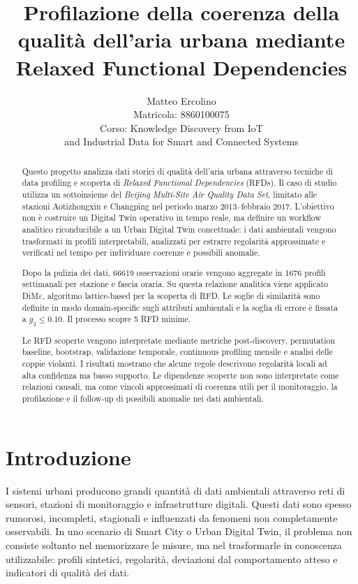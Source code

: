 \documentclass[a4paper,12pt]{article}
\title{\textbf{Profilazione della coerenza della qualità dell'aria urbana mediante Relaxed Functional Dependencies}}
\author{Matteo Ercolino \\ Matricola: 8860100075 \\ Corso: Knowledge Discovery from IoT \\and Industrial Data for Smart and Connected Systems}
\newcommand{\Dime}{DiM\ensuremath{\varepsilon}}
\begin{document}
\maketitle

\begin{abstract}
Questo progetto analizza dati storici di qualità dell'aria urbana attraverso tecniche di data profiling e scoperta di \textit{Relaxed Functional Dependencies} (RFDs). Il caso di studio utilizza un sottoinsieme del \textit{Beijing Multi-Site Air Quality Data Set}, limitato alle stazioni Aotizhongxin e Changping nel periodo marzo 2013--febbraio 2017. L'obiettivo non è costruire un Digital Twin operativo in tempo reale, ma definire un workflow analitico riconducibile a un Urban Digital Twin concettuale: i dati ambientali vengono trasformati in profili interpretabili, analizzati per estrarre regolarità approssimate e verificati nel tempo per individuare coerenze e possibili anomalie.

Dopo la pulizia dei dati, 66619 osservazioni orarie vengono aggregate in 1676 profili settimanali per stazione e fascia oraria. Su questa relazione analitica viene applicato \Dime, algoritmo lattice-based per la scoperta di RFD. Le soglie di similarità sono definite in modo domain-specific sugli attributi ambientali e la soglia di errore è fissata a $g_3 \leq 0.10$. Il processo scopre 5 RFD minime.

Le RFD scoperte vengono interpretate mediante metriche post-discovery, permutation baseline, bootstrap, validazione temporale, continuous profiling mensile e analisi delle coppie violanti. I risultati mostrano che alcune regole descrivono regolarità locali ad alta confidenza ma basso supporto. Le dipendenze scoperte non sono interpretate come relazioni causali, ma come vincoli approssimati di coerenza utili per il monitoraggio, la profilazione e il follow-up di possibili anomalie nei dati ambientali.
\end{abstract}

\section{Introduzione}

I sistemi urbani producono grandi quantità di dati ambientali attraverso reti di sensori, stazioni di monitoraggio e infrastrutture digitali. Questi dati sono spesso rumorosi, incompleti, stagionali e influenzati da fenomeni non completamente osservabili. In uno scenario di Smart City o Urban Digital Twin, il problema non consiste soltanto nel memorizzare le misure, ma nel trasformarle in conoscenza utilizzabile: profili sintetici, regolarità, deviazioni dal comportamento atteso e indicatori di qualità dei dati.
\end{document}
